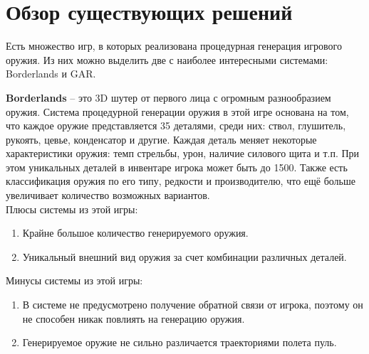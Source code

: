 ﻿%
\section{Обзор существующих решений}\label{sec:existingSolutions}

Есть множество игр, в которых реализована процедурная генерация игрового оружия. Из них можно выделить две с наиболее интересными системами: Borderlands\cite{s14} и GAR\cite{s15}.

\vspace{1mm}

\textbf{Borderlands} -- это 3D шутер от первого лица с огромным разнообразием оружия. Система процедурной генерации оружия в этой игре основана на том, что каждое оружие представляется 35 деталями, среди них: ствол, глушитель, рукоять, цевье, конденсатор и другие. Каждая деталь меняет некоторые характеристики оружия: темп стрельбы, урон, наличие силового щита и т.п. При этом уникальных деталей в инвентаре игрока может быть до 1500. Также есть классификация оружия по его типу, редкости и производителю, что ещё больше увеличивает количество возможных вариантов. 
%
\\Плюсы системы из этой игры:
\begin{enumerate}[--]
    \item Крайне большое количество генерируемого оружия.
    \item Уникальный внешний вид оружия за счет комбинации различных деталей.
\end{enumerate} 
%
Минусы системы из этой игры:
\begin{enumerate}[--]
    \item В системе не предусмотрено получение обратной связи от игрока, поэтому он не способен никак повлиять на генерацию оружия.
    \item Генерируемое оружие не сильно различается траекториями полета пуль.
\end{enumerate}

\vspace{1mm}

